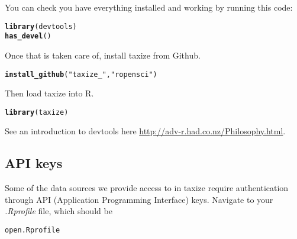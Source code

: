 \documentclass[letterpaper,superscriptaddress,showkeys,longbibliography]{revtex4-1}\usepackage[]{graphicx}\usepackage[]{color}
\makeatletter
\newcommand{\hlstr}[1]{\textcolor[rgb]{0.192,0.494,0.8}{#1}}%
\newcommand{\hlstd}[1]{\textcolor[rgb]{0.345,0.345,0.345}{#1}}%
\newcommand{\hlkwd}[1]{\textcolor[rgb]{0.737,0.353,0.396}{\textbf{#1}}}%
\newenvironment{kframe}{%
 \def\at@end@of@kframe{}%
 \ifinner\ifhmode%
  \def\at@end@of@kframe{\end{minipage}}%
  \begin{minipage}{\columnwidth}%
 \fi\fi%
 \def\FrameCommand##1{\hskip\@totalleftmargin \hskip-\fboxsep
 \colorbox{shadecolor}{##1}\hskip-\fboxsep
     \hskip-\linewidth \hskip-\@totalleftmargin \hskip\columnwidth}%
 \MakeFramed {\advance\hsize-\width
   \@totalleftmargin\z@ \linewidth\hsize
   \@setminipage}}%
 {\par\unskip\endMakeFramed%
 \at@end@of@kframe}
\newenvironment{knitrout}{}{} %
\makeatother
\begin{document}
You can check you have everything installed and working by running this code:

\begin{knitrout}
\color{fgcolor}\begin{kframe}
\begin{alltt}
\hlkwd{library}\hlstd{(devtools)}
\hlkwd{has_devel}\hlstd{()}
\end{alltt}
\end{kframe}
\end{knitrout}


Once that is taken care of, install taxize from Github.

\begin{knitrout}
\color{fgcolor}\begin{kframe}
\begin{alltt}
\hlkwd{install_github}\hlstd{(}\hlstr{"taxize_"}\hlstd{,} \hlstr{"ropensci"}\hlstd{)}
\end{alltt}
\end{kframe}
\end{knitrout}


Then load taxize into R.

\begin{knitrout}
\color{fgcolor}\begin{kframe}
\begin{alltt}
\hlkwd{library}\hlstd{(taxize)}
\end{alltt}
\end{kframe}
\end{knitrout}


See an introduction to devtools here \url{http://adv-r.had.co.nz/Philosophy.html}.

\subsection*{API keys}

Some of the data sources we provide access to in taxize require authentication through API (Application Programming Interface) keys. Navigate to your \emph{.Rprofile} file, which should be 

\begin{knitrout}
\color{fgcolor}\begin{kframe}
\begin{alltt}
open .Rprofile
\end{alltt}
\end{kframe}
\end{knitrout}
\end{document}
